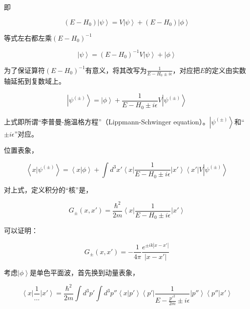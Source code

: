 即

\begin{equation}
( E - H_0 ) \left| \psi \right\rangle = V \left| \psi \right\rangle + ( E - H_0 ) \left| \phi \right\rangle
\end{equation}

等式左右都左乘$( E - H_0)^{-1} $

\begin{equation}
\left| \psi \right\rangle = ( E - H_0)^{-1} V \left| \psi \right\rangle + \left| \phi \right\rangle
\end{equation}

为了保证算符$( E - H_0)^{-1} $有意义，将其改写为$\frac{1}{E - H_0 \pm i \epsilon}$，对应把$E$的定义由实数轴延拓到复数域上。

\begin{equation}
\left| \psi^{(\pm)} \right\rangle = \left| \phi \right\rangle + \frac{1}{E - H_0 \pm i \epsilon } V \left| \psi^{(\pm)} \right\rangle
\end{equation}

上式即所谓“李普曼-施温格方程”（Lippmann-Schwinger equation）。$\left| \psi^{(\pm)} \right\rangle$和“$\pm i \epsilon$”对应。

位置表象，

\begin{equation}
\left\langle x | \psi^{(\pm)} \right\rangle = \left\langle x | \phi \right\rangle + \int d^3 x' \left\langle x \right| \frac{1}{E- H_0 \pm i \epsilon} \left| x' \right\rangle \left\langle x' \right| V \left| \psi^{(\pm)} \right\rangle   
\end{equation}

对上式，定义积分的“核”是，

\begin{equation}
G_{\pm} (x, x') = \frac{\hbar^2}{2m} \left\langle x \right| \frac{1}{E- H_0 \pm i \epsilon} \left| x' \right\rangle
\end{equation}

可以证明：

\begin{equation}
G_{\pm} (x, x') = - \frac{1}{4 \pi} \frac{e^{\pm i k |x - x'|}}{|x - x'|}
\end{equation}

考虑$\left| \phi \right\rangle$是单色平面波，首先换到动量表象，

\begin{equation}
\left\langle x \right| \frac{1}{...}  \left| x' \right\rangle = \frac{\hbar^2}{2m} \int d^3 p' \int d^3 p'' \left\langle x | p' \right\rangle \left\langle p' \right| \frac{1}{E - \frac{p'^2 }{2m } \pm i \epsilon} \left| p'' \right\rangle \left\langle p'' | x' \right\rangle
\end{equation}

